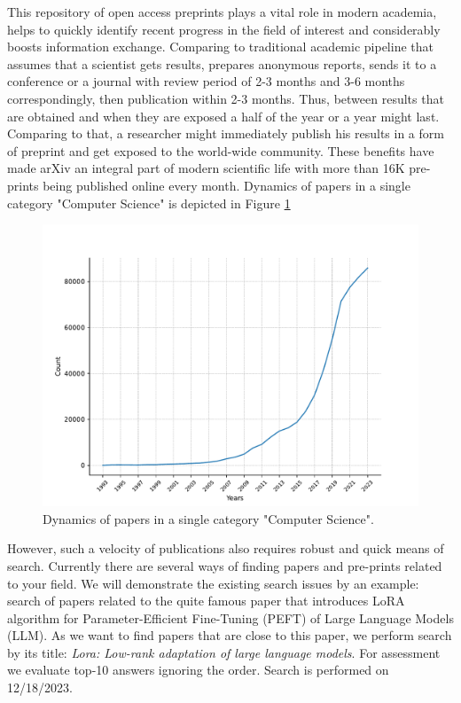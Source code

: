\documentclass{article}
\begin{document}
    This repository of open access preprints plays a vital role in modern academia, helps to quickly identify recent progress in the field of interest and considerably boosts information exchange. Comparing to traditional academic pipeline that assumes that a scientist gets results, prepares anonymous reports, sends it to a conference or a journal with review period of 2-3 months and 3-6 months correspondingly, then publication within 2-3 months. Thus, between results that are obtained and when they are exposed a half of the year or a year might last. Comparing to that, a researcher might immediately publish his results in a form of preprint and get exposed to the world-wide community. These benefits have made arXiv an integral part of modern scientific life with more than 16K pre-prints being published online every month. Dynamics of papers in a single category "Computer Science" is depicted in Figure \ref{fig:cumulative}

    \begin{figure}[H]
        \centering
        \includegraphics[width=0.99\linewidth]{img/number_of_articles_in_years.pdf}
        \caption{Dynamics of papers in a single category "Computer Science".}
        \label{fig:cumulative}
    \end{figure}
    
    However, such a velocity of publications also requires robust and quick means of search. Currently there are several ways of finding papers and pre-prints related to your field. We will demonstrate the existing search issues by an example: search of papers related to the quite famous paper \cite{hu2021lora} that introduces LoRA algorithm for Parameter-Efficient Fine-Tuning (PEFT) of Large Language Models (LLM). As we want to find papers that are close to this paper, we perform search by its title: \textit{Lora: Low-rank adaptation of large language models}. For assessment we evaluate top-10 answers ignoring the order. Search is performed on 12/18/2023.
    
\end{document}
